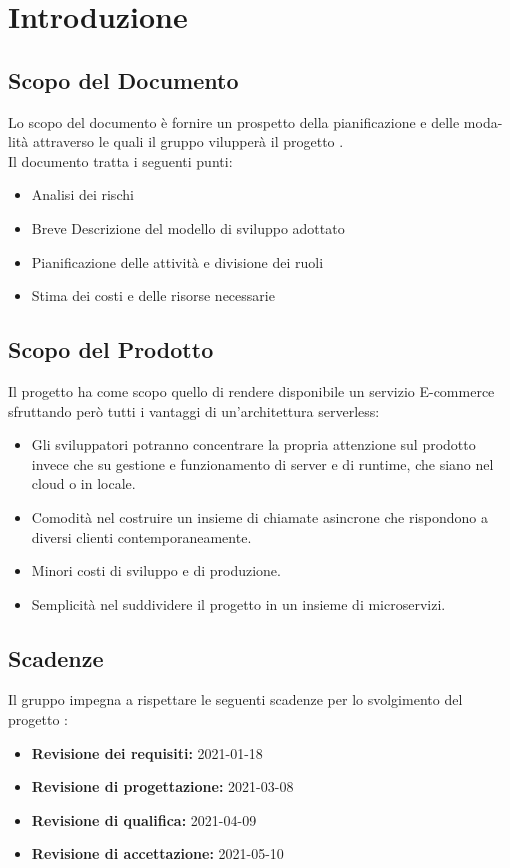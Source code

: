 \section{Introduzione}
\subsection{Scopo del Documento}
Lo scopo del documento è fornire un prospetto della pianificazione e delle moda-lità attraverso le quali il gruppo \Gruppo vilupperà il progetto \NomeProgetto.
\\ Il documento tratta i seguenti punti:
\begin{itemize}
    \item Analisi dei rischi
    \item Breve Descrizione del modello di sviluppo adottato
    \item Pianificazione delle attività e divisione dei ruoli
    \item Stima dei costi e delle risorse necessarie
\end{itemize}

\subsection{Scopo del Prodotto}
Il progetto \NomeProgetto ha come scopo quello di rendere disponibile un servizio
E-commerce sfruttando però tutti i vantaggi di un'architettura serverless:
\begin{itemize}
    \item Gli sviluppatori potranno concentrare la propria attenzione sul prodotto invece che su gestione e funzionamento di server e di runtime, che siano nel cloud o in locale.
    \item Comodità nel costruire un insieme di chiamate asincrone che rispondono a diversi clienti contemporaneamente.
    \item Minori costi di sviluppo e di produzione.
    \item Semplicità nel suddividere il progetto in un insieme di microservizi.
\end{itemize}

\subsection{Scadenze}
Il gruppo \Gruppo impegna a rispettare le seguenti scadenze per lo svolgimento del
progetto \NomeProgetto:

\begin{itemize}
    \item \textbf{Revisione dei requisiti:} 2021-01-18
    \item \textbf{Revisione di progettazione:} 2021-03-08
    \item \textbf{Revisione di qualifica:} 2021-04-09
    \item \textbf{Revisione di accettazione:} 2021-05-10
\end{itemize}

